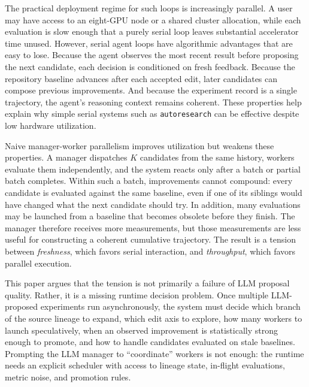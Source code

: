 \documentclass{article}
\begin{document}
The practical deployment regime for such loops is increasingly parallel. A user may have access to an eight-GPU node or a shared cluster allocation, while each evaluation is slow enough that a purely serial loop leaves substantial accelerator time unused. However, serial agent loops have algorithmic advantages that are easy to lose. Because the agent observes the most recent result before proposing the next candidate, each decision is conditioned on fresh feedback. Because the repository baseline advances after each accepted edit, later candidates can compose previous improvements. And because the experiment record is a single trajectory, the agent's reasoning context remains coherent. These properties help explain why simple serial systems such as \texttt{autoresearch} \citep{karpathy_autoresearch} can be effective despite low hardware utilization.

Naive manager-worker parallelism improves utilization but weakens these properties. A manager dispatches $K$ candidates from the same history, workers evaluate them independently, and the system reacts only after a batch or partial batch completes. Within such a batch, improvements cannot compound: every candidate is evaluated against the same baseline, even if one of its siblings would have changed what the next candidate should try. In addition, many evaluations may be launched from a baseline that becomes obsolete before they finish. The manager therefore receives more measurements, but those measurements are less useful for constructing a coherent cumulative trajectory. The result is a tension between \emph{freshness}, which favors serial interaction, and \emph{throughput}, which favors parallel execution.

This paper argues that the tension is not primarily a failure of LLM proposal quality. Rather, it is a missing runtime decision problem. Once multiple LLM-proposed experiments run asynchronously, the system must decide which branch of the source lineage to expand, which edit axis to explore, how many workers to launch speculatively, when an observed improvement is statistically strong enough to promote, and how to handle candidates evaluated on stale baselines. Prompting the LLM manager to ``coordinate'' workers is not enough: the runtime needs an explicit scheduler with access to lineage state, in-flight evaluations, metric noise, and promotion rules.
\end{document}
